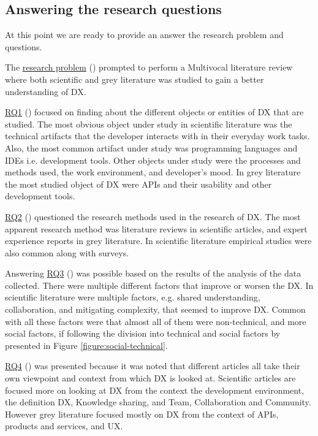 \documentclass[english, 12pt, a4paper, sci, utf8, a-1b, online]{aaltothesis}
\begin{document}
\subsection{Answering the research questions}

At this point we are ready to provide an answer the research problem and questions.

The \hyperref[research-problem]{research problem} (\researchproblem) prompted to perform a Multivocal literature review where both scientific and grey literature was studied to gain a better understanding of DX.

\hyperref[RQ1]{RQ1} (\rqone) focused on finding about the different objects or entities of DX that are studied. The most obvious object under study in scientific literature was the technical artifacts that the developer interacts with in their everyday work tasks. Also, the most common artifact under study was programming languages and IDEs i.e. development tools. Other objects under study were the processes and methods used, the work environment, and developer's mood. In grey literature the most studied object of DX were APIs and their usability and other development tools.

\hyperref[RQ2]{RQ2} (\rqtwo) questioned the research methods used in the research of DX. The most apparent research method was literature reviews in scientific articles, and expert experience reports in grey literature. In scientific literature empirical studies were also common along with surveys.

Answering \hyperref[RQ3]{RQ3} (\rqthree) was possible based on the results of the analysis of the data collected. There were multiple different factors that improve or worsen the DX. In scientific literature were multiple factors, e.g. shared understanding, collaboration, and mitigating complexity, that seemed to improve DX. Common with all these factors were that almost all of them were non-technical, and more social factors, if following the division into technical and social factors by \textcite{fagerholm-doctoral-thesis} presented in Figure \ref{figure:social-technical}.

\hyperref[RQ4]{RQ4} (\rqfour) was presented because it was noted that different articles all take their own viewpoint and context from which DX is looked at. Scientific articles are focused more on looking at DX from the context the development environment, the definition DX, Knowledge sharing, and Team, Collaboration and Community. However grey literature focused mostly on DX from the context of APIs, products and services, and UX.
\end{document}
